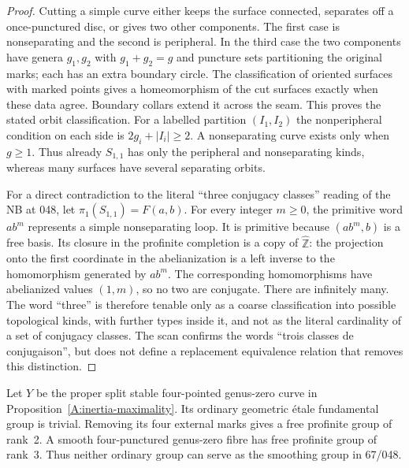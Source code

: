 \begin{proof}
Cutting a simple curve either keeps the surface connected, separates
off a once-punctured disc, or gives two other components. The first
case is nonseparating and the second is peripheral. In the third case
the two components have genera $g_1,g_2$ with $g_1+g_2=g$ and
puncture sets partitioning the original marks; each has an extra
boundary circle. The classification of oriented surfaces with marked
points gives a homeomorphism of the cut surfaces exactly when these
data agree. Boundary collars extend it across the seam. This proves
the stated orbit classification. For a labelled partition $(I_1,I_2)$
the nonperipheral condition on each side is
$2g_i+|I_i|\ge2$. A nonseparating curve exists only when $g\ge1$.
Thus already $S_{1,1}$ has only the peripheral and nonseparating
kinds, whereas many surfaces have several separating orbits.

For a direct contradiction to the literal ``three conjugacy
classes'' reading of the NB at 048, let
$\pi_1(S_{1,1})=F(a,b)$. For every integer $m\ge0$, the primitive
word $ab^m$ represents a simple nonseparating loop. It is primitive
because $(ab^m,b)$ is a free basis. Its closure in the profinite
completion is a copy of $\widehat{\mathbb Z}$: the projection onto
the first coordinate in the abelianization is a left inverse to
the homomorphism generated by $ab^m$. The corresponding
homomorphisms have abelianized values $(1,m)$, so no two are
conjugate. There are infinitely many. The word ``three'' is
therefore tenable only as a coarse classification into possible
topological kinds, with further types inside it, and not as the
literal cardinality of a set of conjugacy classes. The scan confirms
the words ``trois classes de conjugaison'', but does not define a
replacement equivalence relation that removes this distinction.
\end{proof}

\begin{proposition}
\label{A:ordinary-nodal-loss}
Let $Y$ be the proper split stable four-pointed genus-zero curve in
Proposition~\ref{A:inertia-maximality}. Its ordinary geometric
\'etale fundamental group is trivial. Removing its four external
marks gives a free profinite group of rank~2. A smooth four-punctured
genus-zero fibre has free profinite group of rank~3. Thus neither
ordinary group can serve as the smoothing group in 67/048.
\end{proposition}

